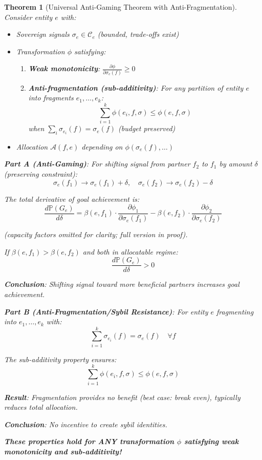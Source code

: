 \documentclass[11pt,a4paper]{article}
\newtheorem{theorem}{Theorem}[section]
\theoremstyle{definition}
\theoremstyle{remark}
\newcommand{\A}{\mathcal{A}}
\newcommand{\C}{\mathcal{C}}
\begin{document}
\begin{theorem}[Universal Anti-Gaming Theorem with Anti-Fragmentation]
\label{thm:anti-gaming}
Consider entity $e$ with:
\begin{itemize}
\item Sovereign signals $\sigma_e \in \C_e$ (bounded, trade-offs exist)
\item Transformation $\phi$ satisfying:
  \begin{enumerate}
  \item \textbf{Weak monotonicity}: $\frac{\partial \phi}{\partial \sigma_e(f)} \ge 0$
  \item \textbf{Anti-fragmentation (sub-additivity)}: For any partition of entity $e$ into fragments $e_1, \ldots, e_k$:
  \[ \sum_{i=1}^k \phi(e_i, f, \sigma) \le \phi(e, f, \sigma) \]
  when $\sum_i \sigma_{e_i}(f) = \sigma_e(f)$ (budget preserved)
  \end{enumerate}
\item Allocation $\A(f,e)$ depending on $\phi(\sigma_e(f), \ldots)$
\end{itemize}

\textbf{Part A (Anti-Gaming)}: For shifting signal from partner $f_2$ to $f_1$ by amount $\delta$ (preserving constraint):
\[ \sigma_e(f_1) \to \sigma_e(f_1) + \delta, \quad \sigma_e(f_2) \to \sigma_e(f_2) - \delta \]

The total derivative of goal achievement is:
\[ \frac{d\mathbb{P}(G_e)}{d\delta} = \beta(e,f_1) \cdot \frac{\partial \phi_1}{\partial \sigma_e(f_1)} - \beta(e,f_2) \cdot \frac{\partial \phi_2}{\partial \sigma_e(f_2)} \]

(capacity factors omitted for clarity; full version in proof).

If $\beta(e,f_1) > \beta(e,f_2)$ and both in allocatable regime:
\[ \frac{d\mathbb{P}(G_e)}{d\delta} > 0 \]

\textbf{Conclusion}: Shifting signal toward more beneficial partners increases goal achievement.

\textbf{Part B (Anti-Fragmentation/Sybil Resistance)}: For entity $e$ fragmenting into $e_1, \ldots, e_k$ with:
\[ \sum_{i=1}^k \sigma_{e_i}(f) = \sigma_e(f) \quad \forall f \]

The sub-additivity property ensures:
\[ \sum_{i=1}^k \phi(e_i, f, \sigma) \le \phi(e, f, \sigma) \]

\textbf{Result}: Fragmentation provides no benefit (best case: break even), typically reduces total allocation.

\textbf{Conclusion}: No incentive to create sybil identities.

\medskip

\textbf{These properties hold for ANY transformation $\phi$ satisfying weak monotonicity and sub-additivity!}
\end{theorem}
\end{document}
